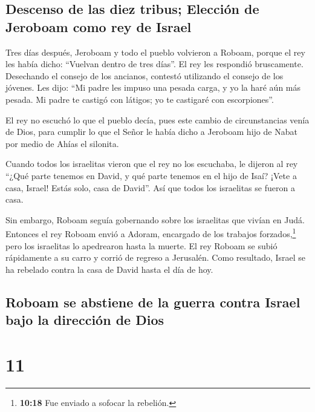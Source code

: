 \hypertarget{descenso-de-las-diez-tribus-elecciuxf3n-de-jeroboam-como-rey-de-israel}{%
\subsection{Descenso de las diez tribus; Elección de Jeroboam como rey
de
Israel}\label{descenso-de-las-diez-tribus-elecciuxf3n-de-jeroboam-como-rey-de-israel}}

 Tres días después, Jeroboam y todo el pueblo volvieron a
Roboam, porque el rey les había dicho: ``Vuelvan dentro de tres días''.
 El rey les respondió bruscamente. Desechando el consejo
de los ancianos,  contestó utilizando el consejo de los
jóvenes. Les dijo: ``Mi padre les impuso una pesada carga, y yo la haré
aún más pesada. Mi padre te castigó con látigos; yo te castigaré con
escorpiones''.

 El rey no escuchó lo que el pueblo decía, pues este
cambio de circunstancias venía de Dios, para cumplir lo que el Señor le
había dicho a Jeroboam hijo de Nabat por medio de Ahías el silonita.

 Cuando todos los israelitas vieron que el rey no los
escuchaba, le dijeron al rey ``¿Qué parte tenemos en David, y qué parte
tenemos en el hijo de Isaí? ¡Vete a casa, Israel! Estás solo, casa de
David''. Así que todos los israelitas se fueron a casa.

 Sin embargo, Roboam seguía gobernando sobre los
israelitas que vivían en Judá.  Entonces el rey Roboam
envió a Adoram, encargado de los trabajos forzados,\footnote{\textbf{10:18}
  Fue enviado a sofocar la rebelión.} pero los israelitas lo apedrearon
hasta la muerte. El rey Roboam se subió rápidamente a su carro y corrió
de regreso a Jerusalén.  Como resultado, Israel se ha
rebelado contra la casa de David hasta el día de hoy.

\hypertarget{roboam-se-abstiene-de-la-guerra-contra-israel-bajo-la-direcciuxf3n-de-dios}{%
\subsection{Roboam se abstiene de la guerra contra Israel bajo la
dirección de
Dios}\label{roboam-se-abstiene-de-la-guerra-contra-israel-bajo-la-direcciuxf3n-de-dios}}

\hypertarget{section-10}{%
\section{11}\label{section-10}}

